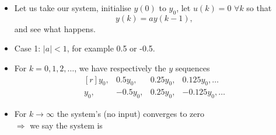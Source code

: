 \begin{frame}
\myPause
 \begin{itemize}[<+-| alert@+>]
 \item Let us take our system, initialise $y(0)$ to $y_0$, let $u(k)=0$ $\forall k$ so that
       \begin{displaymath}
        y(k) = ay(k-1),
       \end{displaymath}
       and see what happens.
 \item \vfill Case 1: $|a|<1$, for example 0.5 or -0.5.\\
 \item[] For $k=0,1,2,\ldots$, we have respectively the $y$ sequences
       \begin{displaymath}
        \begin{matrix*}[r]
          y_0, &  0.5y_0, & 0.25y_0, &  0.125y_0, \ldots \\
          y_0, & -0.5y_0, & 0.25y_0, & -0.125y_0, \ldots
        \end{matrix*}
       \end{displaymath}       
 \item[] For $k\rightarrow\infty$ the system's  (no input) converges to zero\\
         $\Rightarrow$ we say the system is       
 \end{itemize}
\end{frame}

